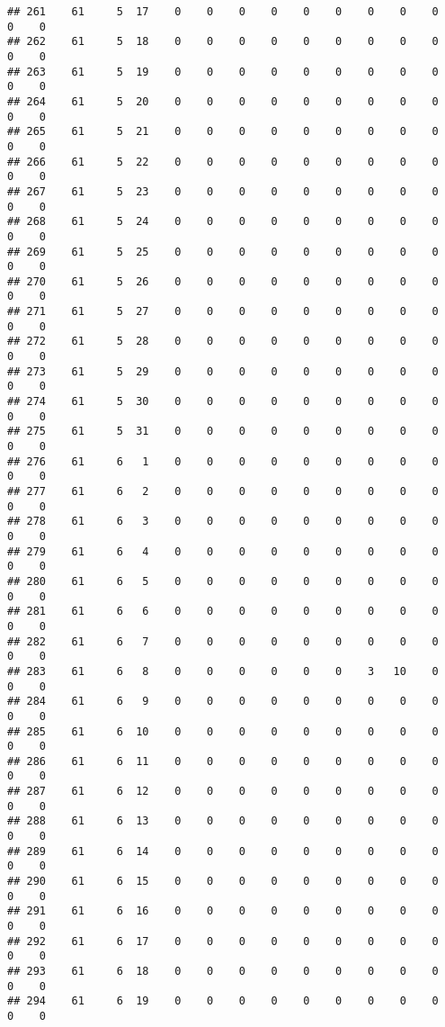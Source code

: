 \documentclass[]{article}
\begin{document}
\begin{verbatim}
## 261    61     5  17    0    0    0    0    0    0    0    0    0    0    0
## 262    61     5  18    0    0    0    0    0    0    0    0    0    0    0
## 263    61     5  19    0    0    0    0    0    0    0    0    0    0    0
## 264    61     5  20    0    0    0    0    0    0    0    0    0    0    0
## 265    61     5  21    0    0    0    0    0    0    0    0    0    0    0
## 266    61     5  22    0    0    0    0    0    0    0    0    0    0    0
## 267    61     5  23    0    0    0    0    0    0    0    0    0    0    0
## 268    61     5  24    0    0    0    0    0    0    0    0    0    0    0
## 269    61     5  25    0    0    0    0    0    0    0    0    0    0    0
## 270    61     5  26    0    0    0    0    0    0    0    0    0    0    0
## 271    61     5  27    0    0    0    0    0    0    0    0    0    0    0
## 272    61     5  28    0    0    0    0    0    0    0    0    0    0    0
## 273    61     5  29    0    0    0    0    0    0    0    0    0    0    0
## 274    61     5  30    0    0    0    0    0    0    0    0    0    0    0
## 275    61     5  31    0    0    0    0    0    0    0    0    0    0    0
## 276    61     6   1    0    0    0    0    0    0    0    0    0    0    0
## 277    61     6   2    0    0    0    0    0    0    0    0    0    0    0
## 278    61     6   3    0    0    0    0    0    0    0    0    0    0    0
## 279    61     6   4    0    0    0    0    0    0    0    0    0    0    0
## 280    61     6   5    0    0    0    0    0    0    0    0    0    0    0
## 281    61     6   6    0    0    0    0    0    0    0    0    0    0    0
## 282    61     6   7    0    0    0    0    0    0    0    0    0    0    0
## 283    61     6   8    0    0    0    0    0    0    3   10    0    0    0
## 284    61     6   9    0    0    0    0    0    0    0    0    0    0    0
## 285    61     6  10    0    0    0    0    0    0    0    0    0    0    0
## 286    61     6  11    0    0    0    0    0    0    0    0    0    0    0
## 287    61     6  12    0    0    0    0    0    0    0    0    0    0    0
## 288    61     6  13    0    0    0    0    0    0    0    0    0    0    0
## 289    61     6  14    0    0    0    0    0    0    0    0    0    0    0
## 290    61     6  15    0    0    0    0    0    0    0    0    0    0    0
## 291    61     6  16    0    0    0    0    0    0    0    0    0    0    0
## 292    61     6  17    0    0    0    0    0    0    0    0    0    0    0
## 293    61     6  18    0    0    0    0    0    0    0    0    0    0    0
## 294    61     6  19    0    0    0    0    0    0    0    0    0    0    0

\end{verbatim}
\end{document}
